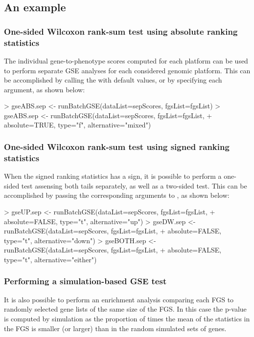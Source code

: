 \documentclass[11pt]{article}
\newcommand{\Rcode}[1]{{\texttt{\color{BrickRed}{#1}}}}
\renewenvironment{Schunk}{\vspace{\topsep}}{\vspace{\topsep}}
\begin{document}
\subsection{An example}
\subsubsection{One-sided Wilcoxon rank-sum test using absolute ranking statistics}
The individual gene-to-phenotype scores computed for each platform
can be used to perform separate GSE analyses for each considered
genomic platform.
This can be accomplished by calling the \Rcode{runBatchGSE} with default
values, or by specifying each argument, as shown below:

\begin{Schunk}
\begin{Sinput}
> gseABS.sep <- runBatchGSE(dataList=sepScores, fgsList=fgsList)
> gseABS.sep <- runBatchGSE(dataList=sepScores, fgsList=fgsList,
+ 				 absolute=TRUE, type="f", alternative="mixed")
\end{Sinput}
\end{Schunk}


\subsubsection{One-sided Wilcoxon rank-sum test using signed ranking statistics}
When the signed ranking statistics has a sign, it is possible to perform a one-sided
test assensing both tails separately, as well as a two-sided test.
This can be accomplished by passing the corresponding arguments 
to \Rcode{runBatchGSE}, as shown below:

\begin{Schunk}
\begin{Sinput}
> gseUP.sep <- runBatchGSE(dataList=sepScores, fgsList=fgsList,
+ 				 absolute=FALSE, type="t", alternative="up")
> gseDW.sep <- runBatchGSE(dataList=sepScores, fgsList=fgsList,
+ 				 absolute=FALSE, type="t", alternative="down")
> gseBOTH.sep <- runBatchGSE(dataList=sepScores, fgsList=fgsList,
+ 				 absolute=FALSE, type="t", alternative="either")
\end{Sinput}
\end{Schunk}


\subsubsection{Performing a simulation-based GSE test}
It is also possible to perform an enrichment analysis comparing each FGS
to randomly selected gene lists of the same size of the FGS.
In this case  the p-value is computed by simulation as the proportion 
of times the mean of the statistics in the FGS is smaller (or larger) than in the 
\Rcode{nsim} random simulated sets of genes.
\end{document}
